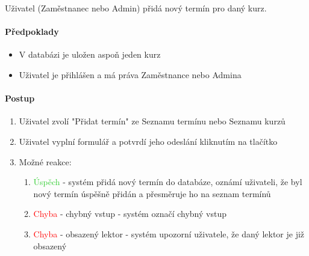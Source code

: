 \documentclass[12pt,a4paper,titlepage,final]{report}
\begin{document}
Uživatel (Zaměstnanec nebo Admin) přidá nový termín pro daný kurz.

\paragraph{Předpoklady}

\begin{itemize}
	\item V databázi je uložen aspoň jeden kurz
	\item Uživatel je přihlášen a má práva Zaměstnance nebo Admina
\end{itemize}

\paragraph{Postup}

\begin{enumerate}
	\item Uživatel zvolí "Přidat termín" ze Seznamu termínu nebo Seznamu kurzů
	\item Uživatel vyplní formulář a potvrdí jeho odeslání kliknutím na tlačítko
	\item Možné reakce:
	\begin{enumerate}
		\item \textcolor{LimeGreen}{Úspěch} - systém přidá nový termín do databáze, oznámí uživateli, že byl nový termín úspěšně přidán a přesměruje ho na seznam termínů
		\item \textcolor{Red}{Chyba} - chybný vstup - systém označí chybný vstup
		\item \textcolor{Red}{Chyba} - obsazený lektor - systém upozorní uživatele, že daný lektor je již obsazený
	\end{enumerate}
\end{enumerate}
\end{document}
